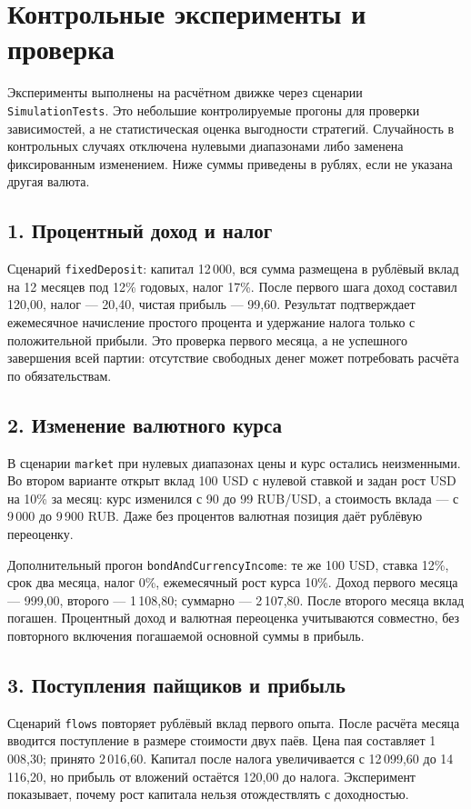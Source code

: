\documentclass[11pt,a4paper]{article}
\newcommand{\code}[1]{\texttt{#1}}
\begin{document}
\newpage
\section{Контрольные эксперименты и проверка}
Эксперименты выполнены на расчётном движке через сценарии \code{SimulationTests}. Это небольшие контролируемые прогоны для проверки зависимостей, а не статистическая оценка выгодности стратегий. Случайность в контрольных случаях отключена нулевыми диапазонами либо заменена фиксированным изменением. Ниже суммы приведены в рублях, если не указана другая валюта.

\subsection*{1. Процентный доход и налог}
Сценарий \code{fixedDeposit}: капитал 12\,000, вся сумма размещена в рублёвый вклад на 12 месяцев под 12\% годовых, налог 17\%. После первого шага доход составил 120,00, налог --- 20,40, чистая прибыль --- 99,60. Результат подтверждает ежемесячное начисление простого процента и удержание налога только с положительной прибыли. Это проверка первого месяца, а не успешного завершения всей партии: отсутствие свободных денег может потребовать расчёта по обязательствам.

\subsection*{2. Изменение валютного курса}
В сценарии \code{market} при нулевых диапазонах цены и курс остались неизменными. Во втором варианте открыт вклад 100 USD с нулевой ставкой и задан рост USD на 10\% за месяц: курс изменился с 90 до 99 RUB/USD, а стоимость вклада --- с 9\,000 до 9\,900 RUB. Даже без процентов валютная позиция даёт рублёвую переоценку.

Дополнительный прогон \code{bondAndCurrencyIncome}: те же 100 USD, ставка 12\%, срок два месяца, налог 0\%, ежемесячный рост курса 10\%. Доход первого месяца --- 999,00, второго --- 1\,108,80; суммарно --- 2\,107,80. После второго месяца вклад погашен. Процентный доход и валютная переоценка учитываются совместно, без повторного включения погашаемой основной суммы в прибыль.

\subsection*{3. Поступления пайщиков и прибыль}
Сценарий \code{flows} повторяет рублёвый вклад первого опыта. После расчёта месяца вводится поступление в размере стоимости двух паёв. Цена пая составляет 1\,008,30; принято 2\,016,60. Капитал после налога увеличивается с 12\,099,60 до 14\,116,20, но прибыль от вложений остаётся 120,00 до налога. Эксперимент показывает, почему рост капитала нельзя отождествлять с доходностью.
\end{document}
